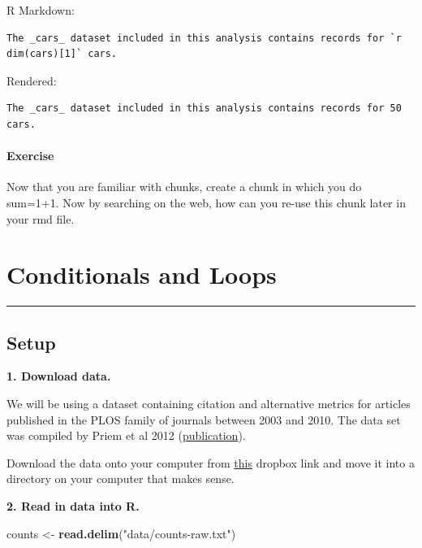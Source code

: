 \documentclass[
]{book}
\newenvironment{Shaded}{\begin{snugshade}}{\end{snugshade}}
\newcommand{\KeywordTok}[1]{\textcolor[rgb]{0.13,0.29,0.53}{\textbf{#1}}}
\newcommand{\NormalTok}[1]{#1}
\newcommand{\StringTok}[1]{\textcolor[rgb]{0.31,0.60,0.02}{#1}}
\begin{document}
R Markdown:

\begin{verbatim}
The _cars_ dataset included in this analysis contains records for `r dim(cars)[1]` cars. 
\end{verbatim}

Rendered:

\begin{verbatim}
The _cars_ dataset included in this analysis contains records for 50 cars.
\end{verbatim}

\hypertarget{exercise-1}{%
\subsubsection{Exercise}\label{exercise-1}}

Now that you are familiar with chunks, create a chunk in which you do sum=1+1. Now by searching on the web, how can you re-use this chunk later in your rmd file.

\hypertarget{conditionals-and-loops}{%
\chapter{Conditionals and Loops}\label{conditionals-and-loops}}

\begin{center}\rule{0.5\linewidth}{0.5pt}\end{center}

\hypertarget{setup}{%
\section{Setup}\label{setup}}

\textbf{1. Download data.}

We will be using a dataset containing citation and alternative metrics for articles published in the PLOS family of journals between 2003 and 2010. The data set was compiled by Priem et al 2012 (\href{http://arxiv.org/abs/1203.4745}{publication}).

Download the data onto your computer from \href{https://www.dropbox.com/s/up38z3fd4llanrb/counts-raw.txt?dl=0}{this} dropbox link and move it into a directory on your computer that makes sense.

\textbf{2. Read in data into R.}

\begin{Shaded}
\begin{Highlighting}[]
\NormalTok{counts <-}\StringTok{ }\KeywordTok{read.delim}\NormalTok{(}\StringTok{"data/counts-raw.txt"}\NormalTok{)}
\end{Highlighting}
\end{Shaded}
\end{document}
